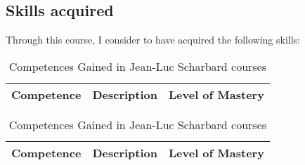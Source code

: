 \subsection{Skills acquired}
Through this course, I consider to have acquired the following skills:

\begin{table}[H]
    \centering
    \begin{tabular}{|p{3.5cm}|p{8cm}|p{3.5cm}|}
    \hline
    \textbf{Competence} & \textbf{Description} & \textbf{Level of Mastery} \\
    \hline
    \end{tabular}
    \caption{Competences Gained in Jean-Luc Scharbard courses}
\end{table}

\begin{table}[h!]
    \centering
    \begin{tabular}{|p{3.5cm}|p{8cm}|p{3.5cm}|}
    \hline
    \textbf{Competence} & \textbf{Description} & \textbf{Level of Mastery} \\
    \hline
    \end{tabular}
    \caption{Competences Gained in Jean-Luc Scharbard courses}
\end{table} 


